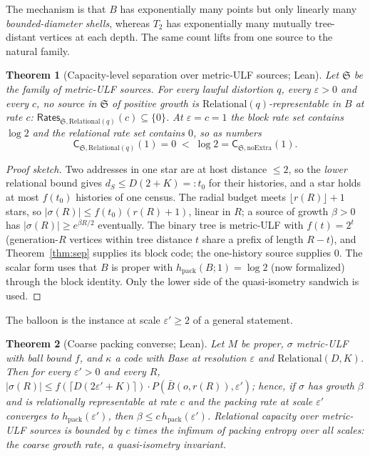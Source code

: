 \documentclass[11pt,a4paper]{article}
\theoremstyle{plain}
\newtheorem{theorem}{Theorem}
\theoremstyle{definition}
\theoremstyle{remark}
\newcommand{\Rates}{\mathsf{Rates}}
\newcommand{\Capy}{\mathsf{C}}
\newcommand{\hpack}{h_{\mathrm{pack}}}
\begin{document}
The mechanism is that $B$ has exponentially many points but only linearly many
\emph{bounded-diameter shells}, whereas $T_2$ has exponentially many mutually
tree-distant vertices at each depth. The same count lifts from one source to
the natural family.

\begin{theorem}[Capacity-level separation over metric-ULF sources; Lean]\label{thm:sepcap}
Let $\mathfrak S$ be the family of metric-ULF sources. For every lawful
distortion $q$, every $\varepsilon>0$ and every $c$, no source in $\mathfrak S$
of positive growth is $\mathrm{Relational}(q)$-representable in $B$ at rate
$c$: $\Rates_{\mathfrak S,\mathrm{Relational}(q)}(c)\subseteq\{0\}$. At
$\varepsilon=c=1$ the block rate set contains $\log 2$ and the relational rate
set contains $0$, so as numbers
\[
  \Capy_{\mathfrak S,\mathrm{Relational}(q)}(1)=0
  \;<\;\log 2=\Capy_{\mathfrak S,\mathrm{noExtra}}(1).
\]
\end{theorem}

\begin{proof}[Proof sketch]
Two addresses in one star are at host distance $\le 2$, so the \emph{lower}
relational bound gives $d_S\le D(2+K)=:t_0$ for their histories, and a star
holds at most $f(t_0)$ histories of one census. The radial budget meets
$\lfloor r(R)\rfloor+1$ stars, so $|\sigma(R)|\le f(t_0)(r(R)+1)$, linear in
$R$; a source of growth $\beta>0$ has $|\sigma(R)|\ge e^{\beta R/2}$
eventually. The binary tree is metric-ULF with $f(t)=2^t$ (generation-$R$
vertices within tree distance $t$ share a prefix of length $R-t$), and
Theorem~\ref{thm:sep} supplies its block code; the one-history source
supplies $0$. The scalar form uses that $B$ is proper with
$\hpack(B;1)=\log 2$ (now formalized) through the block identity. Only the
lower side of the quasi-isometry sandwich is used.
\end{proof}

The balloon is the instance at scale $\varepsilon'\ge2$ of a general statement.

\begin{theorem}[Coarse packing converse; Lean]\label{thm:coarse}
Let $M$ be proper, $\sigma$ metric-ULF with ball bound $f$, and $\kappa$ a
code with Base at resolution $\varepsilon$ and $\mathrm{Relational}(D,K)$.
Then for every $\varepsilon'>0$ and every $R$,
$|\sigma(R)|\le f(\lceil D(2\varepsilon'+K)\rceil)\cdot
P(\bar B(o,r(R)),\varepsilon')$; hence, if $\sigma$ has growth $\beta$ and
is relationally representable at rate $c$ and the packing rate at scale
$\varepsilon'$ converges to $\hpack(\varepsilon')$, then
$\beta\le c\,\hpack(\varepsilon')$. Relational capacity over metric-ULF
sources is bounded by $c$ times the infimum of packing entropy over all
scales: the coarse growth rate, a quasi-isometry invariant.
\end{theorem}
\end{document}
